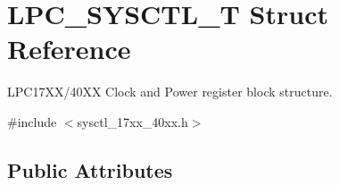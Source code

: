 \hypertarget{struct_l_p_c___s_y_s_c_t_l___t}{\section{L\+P\+C\+\_\+\+S\+Y\+S\+C\+T\+L\+\_\+\+T Struct Reference}
\label{struct_l_p_c___s_y_s_c_t_l___t}
}


L\+P\+C17\+X\+X/40\+X\+X Clock and Power register block structure.  




{\ttfamily \#include $<$sysctl\+\_\+17xx\+\_\+40xx.\+h$>$}

\subsection*{Public Attributes}

